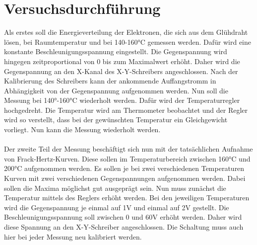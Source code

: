 \section{Versuchsdurchführung}
Als erstes soll die Energieverteilung der Elektronen, die sich aus dem Glühdraht lösen, bei Raumtemperatur 
und bei 140-160°C gemessen werden. Dafür wird eine konstante Beschleunigungsspannung eingestellt. Die Gegenspannung 
wird hingegen zeitproportional von 0 bis zum Maximalwert erhöht. Daher wird die Gegenspannung 
an den X-Kanal des X-Y-Schreibers angeschlossen. Nach der Kalibrierung des Schreibers kann 
der ankommende Auffangstromm in Abhängigkeit von der Gegenspannung aufgenommen werden. 
Nun soll die Messung bei 140°-160°C wiederholt werden. Dafür wird der Temperaturregler hochgedreht. 
Die Temperatur wird am Thermometer beobachtet und der Regler wird so verstellt, dass bei der gewünschten Temperatur ein Gleichgewicht vorliegt.
Nun kann die Messung wiederholt werden.\\
\\
\noindent Der zweite Teil der Messung beschäftigt sich nun mit der tatsächlichen Aufnahme von Frack-Hertz-Kurven.
Diese sollen im Temperaturbereich zwischen 160°C und 200°C aufgenommen werden. Es sollen je bei zwei verschiedenen Temperaturen Kurven 
mit zwei verschiedenen Gegenspannungen aufgenommen werden. Dabei sollen die Maxima möglichst gut ausgeprägt sein.
Nun muss zunächst die Temperatur mittels des Reglers erhöht werden. Bei den jeweiligen Temperaturen wird die Gegenspannung 
je einmal auf 1V und einmal auf 2V gestellt. Die Beschleunigungsspannung soll zwischen 0 und 60V erhöht werden.
Daher wird diese Spannung an den X-Y-Schreiber angeschlossen. Die Schaltung muss auch hier bei jeder Messung neu kalibriert werden. 
\label{sec:Durchführung}
